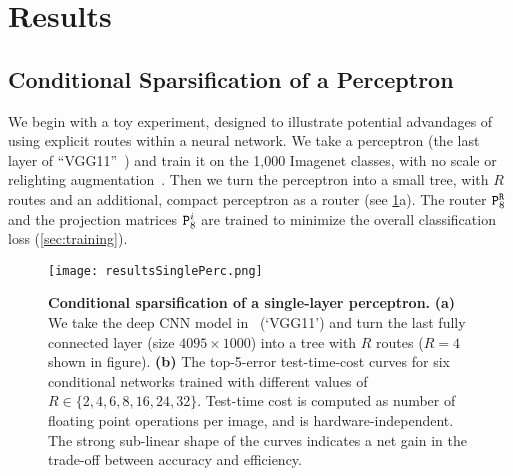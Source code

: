 \documentclass[thesis]{subfiles}
\begin{document}
	
	\section[Results]{Results}

	\subsection{Conditional Sparsification of a Perceptron}\label{sec:results_perceptron}
	We begin with a toy experiment, designed to illustrate potential advandages of using explicit routes within a neural network. We take a perceptron (the last layer of ``VGG11''~\cite{Simonyan2014verydeep}) and
	train it on the 1,000 Imagenet classes, with no scale or relighting augmentation~\cite{Jia2014}.
	Then we turn the perceptron into a small tree, with $R$ routes and an additional, compact perceptron as a router (see \cref{fig:resultsSinglePerc}a). The router ${\mat P}^{\tt R}_8$ and the projection matrices ${\mat P}^i_8$ are trained to minimize the overall classification loss (\cref{sec:training}).

	\begin{figure}[tbp]
	\centerline{
	\texttt{[image: resultsSinglePerc.png]}
	}
	\caption{{\bf Conditional sparsification of a single-layer perceptron.}
	{\bf (a)}  We take the deep CNN model in~\cite{Simonyan2014verydeep} (`VGG11') and turn the last fully connected layer (size $4095\times1000$) into a tree with $R$ routes ($R=4$ shown in figure).
	{\bf (b)} The top-5-error \vs test-time-cost curves for six conditional networks trained with different values of $R\in\{2,4,6,8,16,24,32\}$. 
	Test-time cost is computed as number of floating point operations per image, and is hardware-independent.
	The strong sub-linear shape of the curves indicates a net gain in the trade-off between accuracy and efficiency. 
	}
	\label{fig:resultsSinglePerc}
	\end{figure}
\end{document}
